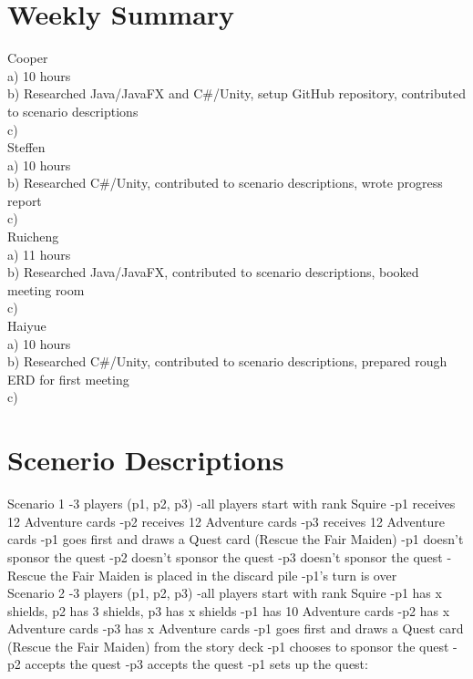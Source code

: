 \documentclass[12pt]{article} %
\begin{document}
\section*{Weekly Summary} %

Cooper\\
a) 10 hours\\
b) Researched Java/JavaFX and C\#/Unity, setup GitHub repository, contributed to scenario descriptions\\
c) \\

Steffen \\
a) 10 hours\\
b) Researched C\#/Unity, contributed to scenario descriptions, wrote progress report \\
c) \\

Ruicheng \\
a) 11 hours\\
b) Researched Java/JavaFX, contributed to scenario descriptions, booked meeting room \\
c) \\

Haiyue \\
a) 10 hours \\
b) Researched C\#/Unity, contributed to scenario descriptions, prepared rough ERD for first meeting \\
c) \\

\section*{Scenerio Descriptions}

\bgroup\obeylines
Scenario 1
-3 players (p1, p2, p3)
-all players start with rank Squire
-p1 receives 12 Adventure cards
-p2 receives 12 Adventure cards
-p3 receives 12 Adventure cards
-p1 goes first and draws a Quest card (Rescue the Fair Maiden)
-p1 doesn't sponsor the quest
-p2 doesn't sponsor the quest
-p3 doesn't sponsor the quest
-Rescue the Fair Maiden is placed in the discard pile
-p1's turn is over\\

Scenario 2
-3 players (p1, p2, p3)
-all players start with rank Squire
-p1 has x shields, p2 has 3 shields, p3 has x shields
-p1 has 10 Adventure cards
-p2 has x Adventure cards
-p3 has x Adventure cards
-p1 goes first and draws a Quest card (Rescue the Fair Maiden) from the story deck
-p1 chooses to sponsor the quest
-p2 accepts the quest
-p3 accepts the quest
-p1 sets up the quest:\\
\egroup
	
\end{document}

